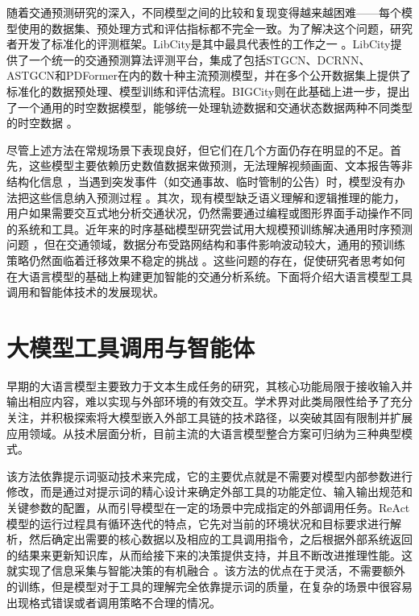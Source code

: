 随着交通预测研究的深入，不同模型之间的比较和复现变得越来越困难——每个模型使用的数据集、预处理方式和评估指标都不完全一致。为了解决这个问题，研究者开发了标准化的评测框架。LibCity是其中最具代表性的工作之一 。LibCity提供了一个统一的交通预测算法评测平台，集成了包括STGCN、DCRNN、ASTGCN和PDFormer在内的数十种主流预测模型，并在多个公开数据集上提供了标准化的数据预处理、模型训练和评估流程。BIGCity则在此基础上进一步，提出了一个通用的时空数据模型，能够统一处理轨迹数据和交通状态数据两种不同类型的时空数据 。

尽管上述方法在常规场景下表现良好，但它们在几个方面仍存在明显的不足。首先，这些模型主要依赖历史数值数据来做预测，无法理解视频画面、文本报告等非结构化信息 ，当遇到突发事件（如交通事故、临时管制的公告）时，模型没有办法把这些信息纳入预测过程 。其次，现有模型缺乏语义理解和逻辑推理的能力，用户如果需要交互式地分析交通状况，仍然需要通过编程或图形界面手动操作不同的系统和工具。近年来的时序基础模型研究尝试用大规模预训练解决通用时序预测问题 ，但在交通领域，数据分布受路网结构和事件影响波动较大，通用的预训练策略仍然面临着迁移效果不稳定的挑战 。这些问题的存在，促使研究者思考如何在大语言模型的基础上构建更加智能的交通分析系统。下面将介绍大语言模型工具调用和智能体技术的发展现状。

\section{大模型工具调用与智能体}

早期的大语言模型主要致力于文本生成任务的研究，其核心功能局限于接收输入并输出相应内容，难以实现与外部环境的有效交互。学术界对此类局限性给予了充分关注，并积极探索将大模型嵌入外部工具链的技术路径，以突破其固有限制并扩展应用领域。从技术层面分析，目前主流的大语言模型整合方案可归纳为三种典型模式。

该方法依靠提示词驱动技术来完成，它的主要优点就是不需要对模型内部参数进行修改，而是通过对提示词的精心设计来确定外部工具的功能定位、输入输出规范和关键参数的配置，从而引导模型在一定的场景中完成指定的外部调用任务。ReAct模型的运行过程具有循环迭代的特点，它先对当前的环境状况和目标要求进行解析，然后确定出需要的核心数据以及相应的工具调用指令，之后根据外部系统返回的结果来更新知识库，从而给接下来的决策提供支持，并且不断改进推理性能。这就实现了信息采集与智能决策的有机融合 。该方法的优点在于灵活，不需要额外的训练，但是模型对于工具的理解完全依靠提示词的质量，在复杂的场景中很容易出现格式错误或者调用策略不合理的情况。

